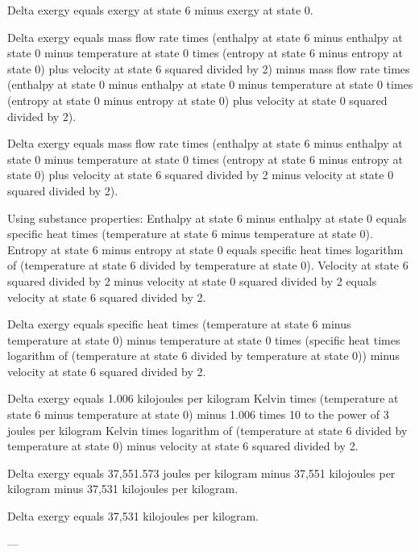 Delta exergy equals exergy at state 6 minus exergy at state 0.  

Delta exergy equals mass flow rate times (enthalpy at state 6 minus enthalpy at state 0 minus temperature at state 0 times (entropy at state 6 minus entropy at state 0) plus velocity at state 6 squared divided by 2) minus mass flow rate times (enthalpy at state 0 minus enthalpy at state 0 minus temperature at state 0 times (entropy at state 0 minus entropy at state 0) plus velocity at state 0 squared divided by 2).  

Delta exergy equals mass flow rate times (enthalpy at state 6 minus enthalpy at state 0 minus temperature at state 0 times (entropy at state 6 minus entropy at state 0) plus velocity at state 6 squared divided by 2 minus velocity at state 0 squared divided by 2).  

Using substance properties:  
Enthalpy at state 6 minus enthalpy at state 0 equals specific heat times (temperature at state 6 minus temperature at state 0).  
Entropy at state 6 minus entropy at state 0 equals specific heat times logarithm of (temperature at state 6 divided by temperature at state 0).  
Velocity at state 6 squared divided by 2 minus velocity at state 0 squared divided by 2 equals velocity at state 6 squared divided by 2.  

Delta exergy equals specific heat times (temperature at state 6 minus temperature at state 0) minus temperature at state 0 times (specific heat times logarithm of (temperature at state 6 divided by temperature at state 0)) minus velocity at state 6 squared divided by 2.  

Delta exergy equals 1.006 kilojoules per kilogram Kelvin times (temperature at state 6 minus temperature at state 0) minus 1.006 times 10 to the power of 3 joules per kilogram Kelvin times logarithm of (temperature at state 6 divided by temperature at state 0) minus velocity at state 6 squared divided by 2.  

Delta exergy equals 37,551.573 joules per kilogram minus 37,551 kilojoules per kilogram minus 37,531 kilojoules per kilogram.  

Delta exergy equals 37,531 kilojoules per kilogram.  

---